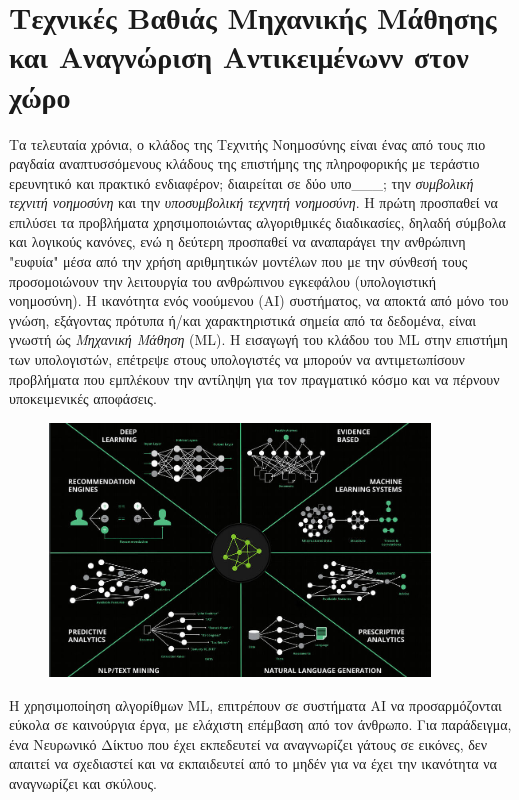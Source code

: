 \chapter{Τεχνικές Βαθιάς Μηχανικής Μάθησης και Αναγνώριση Αντικειμένωνν στον χώρο}
\label{chapter:theory}



Τα τελευταία χρόνια, ο κλάδος της Τεχνιτής Νοημοσύνης είναι ένας από τους πιο ραγδαία
αναπτυσσόμενους κλάδους της επιστήμης της πληροφορικής με τεράστιο
ερευνητικό και πρακτικό ενδιαφέρον; διαιρείται σε δύο υπο\_\_\_; την \emph{συμβολική τεχνιτή
νοημοσύνη} και την \emph{υποσυμβολική τεχνητή νοημοσύνη}. Η πρώτη προσπαθεί να
επιλύσει τα προβλήματα χρησιμοποιώντας αλγοριθμικές διαδικασίες, δηλαδή
σύμβολα και λογικούς κανόνες, ενώ η δεύτερη προσπαθεί να αναπαράγει την
ανθρώπινη "ευφυία" μέσα από την χρήση αριθμητικών μοντέλων
που με την σύνθεσή τους προσομοιώνουν την λειτουργία του ανθρώπινου εγκεφάλου
(υπολογιστική νοημοσύνη).
Η ικανότητα ενός νοούμενου (AI) συστήματος, να αποκτά από μόνο του γνώση,
εξάγοντας πρότυπα ή/και χαρακτηριστικά σημεία από τα δεδομένα,
είναι γνωστή ώς \emph{Μηχανική Μάθηση} (ML).
Η εισαγωγή του κλάδου του ML στην επιστήμη των υπολογιστών,
επέτρεψε στους υπολογιστές να μπορούν να αντιμετωπίσουν προβλήματα που εμπλέκουν
την αντίληψη για τον πραγματικό κόσμο και να πέρνουν υποκειμενικές αποφάσεις.
\begin{figure}[H]
  \centering
  \includegraphics[width=0.9\textwidth]{./images/chapter3/AI_1.jpg}
  \label{fig:AI_1}
\end{figure}
Η χρησιμοποίηση αλγορίθμων ML, επιτρέπουν σε συστήματα AI
να προσαρμόζονται εύκολα σε καινούργια έργα, με ελάχιστη επέμβαση από τον άνθρωπο.
Για παράδειγμα, ένα Νευρωνικό Δίκτυο που έχει εκπεδευτεί να αναγνωρίζει γάτους σε εικόνες,
δεν απαιτεί να σχεδιαστεί και να εκπαιδευτεί από το μηδέν για να έχει την ικανότητα
να αναγνωρίζει και σκύλους.

